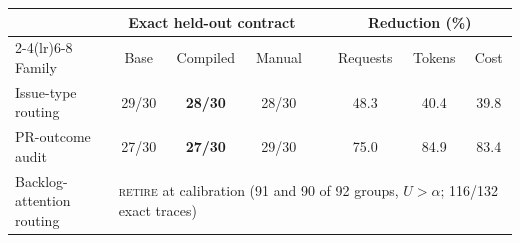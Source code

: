 \begin{tabular}{@{}lccccccc@{}}
\toprule
& \multicolumn{3}{c}{Exact held-out contract} & & \multicolumn{3}{c}{Reduction (\%)} \\
\cmidrule(lr){2-4}\cmidrule(lr){6-8}
Family & Base & Compiled & Manual & & Requests & Tokens & Cost \\
\midrule
\quad Issue-type routing & 29/30 & \textbf{28/30} & 28/30 & & 48.3 & 40.4 & 39.8 \\
\quad PR-outcome audit & 27/30 & \textbf{27/30} & 29/30 & & 75.0 & 84.9 & 83.4 \\
\quad Backlog-attention routing & \multicolumn{7}{l}{\textsc{retire} at calibration (91 and 90 of 92 groups, $U>\alpha$; 116/132 exact traces)} \\
\bottomrule
\end{tabular}
